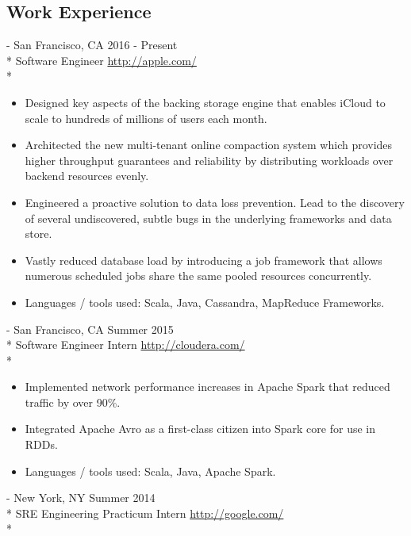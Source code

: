 \documentclass[a4paper,margin,line]{resume}
\newcommand{\rurl}[1]{\hfill {\footnotesize \url{#1}}}
\newcommand{\rdate}[1]{\hfill {\small #1}}
\renewcommand{\employer}[5]{ \item[#1] - #2 \rdate{#3} \\* #4 \rurl{#5} \\*}
\begin{document}
\begin{resume}
  \section{\mysidestyle Work Experience}
  \begin{asparadesc}
    \small
    \employer{Apple Inc. (iCloud)}{San Francisco, CA}{2016 - Present}{Software
      Engineer}{http://apple.com/}
    \vspace{-5mm}
    \begin{itemize}
      \item Designed key aspects of the backing storage engine that enables iCloud to scale to
        hundreds of millions of users each month.
      \item Architected the new multi-tenant online compaction system which provides higher
        throughput guarantees and reliability by distributing workloads over backend resources
        evenly.
      \item Engineered a proactive solution to data loss prevention. Lead to the discovery of
        several undiscovered, subtle bugs in the underlying frameworks and data store.
      \item Vastly reduced database load by introducing a job framework that allows numerous
        scheduled jobs share the same pooled resources concurrently.
      \item Languages / tools used: Scala, Java, Cassandra, MapReduce Frameworks.
    \end{itemize}
    \employer{Cloudera}{San Francisco, CA}{Summer 2015}{Software Engineer
      Intern}{http://cloudera.com/}
    \vspace{-5mm}
    \begin{itemize}
    \item Implemented network performance increases in Apache Spark that reduced traffic by over
      90\%.
    \item Integrated Apache Avro as a first-class citizen into Spark core for use in RDDs.
    \item Languages / tools used: Scala, Java, Apache Spark.
    \end{itemize}
    \employer{Google}{New York, NY}{Summer 2014}{SRE Engineering Practicum
      Intern}{http://google.com/}
    \vspace{-5mm}
    \begin{itemize}

\end{itemize}
\end{asparadesc}
\end{resume}
\end{document}
